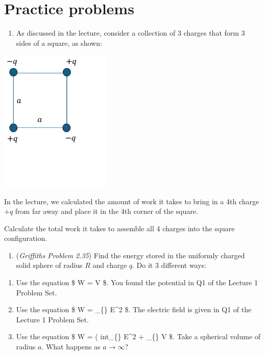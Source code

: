 \documentclass[
  letterpaper,
  DIV=11,
  numbers=noendperiod]{scrreprt}
\providecommand{\tightlist}{%
  \setlength{\itemsep}{0pt}\setlength{\parskip}{0pt}}\usepackage{longtable,booktabs,array}
\begin{document}
\section{Practice problems}\label{practice-problems-1}

\begin{enumerate}
\def\labelenumi{\arabic{enumi})}
\tightlist
\item
  As discussed in the lecture, consider a collection of 3 charges that
  form 3 sides of a square, as shown:
\end{enumerate}

\includegraphics[width=2.08333in,height=\textheight]{Figures/L3_3charges.png}

In the lecture, we calculated the amount of work it takes to bring in a
4th charge \(+q\) from far away and place it in the 4th corner of the
square.

Calculate the total work it takes to assemble all 4 charges into the
square configuration.

\begin{enumerate}
\def\labelenumi{\arabic{enumi})}
\setcounter{enumi}{1}
\tightlist
\item
  (\emph{Griffiths Problem 2.35}) Find the energy stored in the
  uniformly charged solid sphere of radius \(R\) and charge \(q\). Do it
  3 different ways:
\end{enumerate}

\begin{enumerate}
\def\labelenumi{(\alph{enumi})}
\item
  Use the equation \$ W =  \int \rho V  \tau \$.
  You found the potential in Q1 of the Lecture 1 Problem Set.
\item
  Use the equation \$ W = 
  \int\_\{\} E\^{}2  \tau \$. The electric
  field is given in Q1 of the Lecture 1 Problem Set.
\item
  Use the equation \$ W =  \left(
  int\_\{\} E\^{}2  \tau + \oint\_\{\} V
   \cdot {}  \$. Take a
  spherical volume of radius \(a\). What happens as
  \(a \rightarrow \infty\)?
\end{enumerate}
\end{document}
